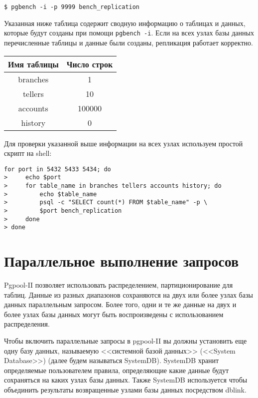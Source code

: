 \begin{lstlisting}[label=lst:pgpool20,caption=Проверка репликации]
$ pgbench -i -p 9999 bench_replication
\end{lstlisting}

Указанная ниже таблица содержит сводную информацию о таблицах и данных, которые будут созданы при помощи \lstinline!pgbench -i!. Если на всех узлах базы данных перечисленные таблицы и данные были созданы, репликация работает корректно.

\begin{tabular}{ | c | c | }
  \hline
  Имя таблицы & Число строк \\
  \hline
  branches & 1 \\
  \hline
  tellers & 10 \\
  \hline
  accounts & 100000 \\
  \hline
  history & 0 \\
  \hline
\end{tabular}

Для проверки указанной выше информации на всех узлах используем простой скрипт на shell:

\begin{lstlisting}[label=lst:pgpool21,caption=Проверка репликации]
for port in 5432 5433 5434; do
>     echo $port
>     for table_name in branches tellers accounts history; do
>         echo $table_name
>         psql -c "SELECT count(*) FROM $table_name" -p \
>         $port bench_replication
>     done
> done
\end{lstlisting}





\section{Параллельное выполнение запросов}

Pgpool-II позволяет использовать распределением, партиционирование для таблиц. Данные из разных диапазонов сохраняются на двух или более узлах базы данных параллельным запросом. Более того, одни и те же данные на двух и более узлах базы данных могут быть воспроизведены с использованием распределения.

Чтобы включить параллельные запросы в pgpool-II вы должны установить еще одну базу данных, называемую <<системной базой данных>> (<<System Database>>) (далее будем называться SystemDB). SystemDB хранит определяемые пользователем правила, определяющие какие данные будут сохраняться на каких узлах базы данных. Также SystemDB используется чтобы объединить результаты возвращенные узлами базы данных посредством dblink.

